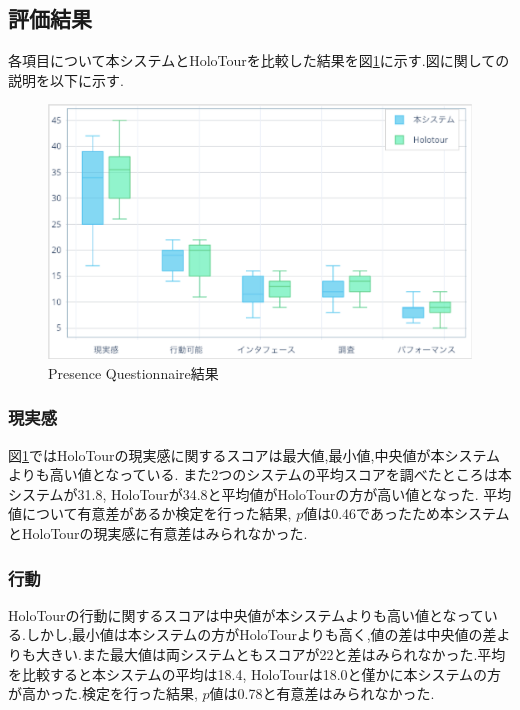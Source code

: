 \subsection{評価結果}

各項目について本システムとHoloTourを比較した結果を図\ref{figure:pqresult}に示す.図に関しての説明を以下に示す.

\begin{figure}[h]
\begin{center}
\includegraphics[width=16cm]{img/05_evaluate/result.eps} 
\end{center}
\caption{Presence Questionnaire結果}
\label{figure:pqresult}
\end{figure} 

\subsubsection{現実感}
図\ref{figure:pqresult}ではHoloTourの現実感に関するスコアは最大値,最小値,中央値が本システムよりも高い値となっている.
また2つのシステムの平均スコアを調べたところは本システムが31.8, HoloTourが34.8と平均値がHoloTourの方が高い値となった.
平均値について有意差があるか検定を行った結果, $p$値は0.46であったため本システムとHoloTourの現実感に有意差はみられなかった.

\subsubsection{行動}
HoloTourの行動に関するスコアは中央値が本システムよりも高い値となっている.しかし,最小値は本システムの方がHoloTourよりも高く,値の差は中央値の差よりも大きい.また最大値は両システムともスコアが22と差はみられなかった.平均を比較すると本システムの平均は18.4, HoloTourは18.0と僅かに本システムの方が高かった.検定を行った結果, $p$値は0.78と有意差はみられなかった.

